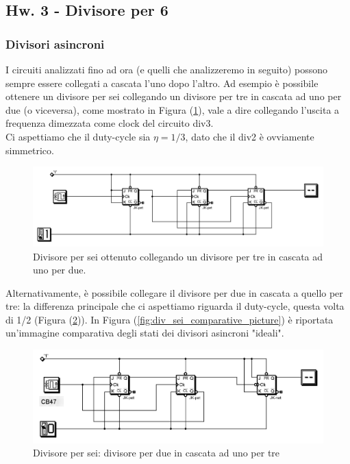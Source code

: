 \documentclass[journal, a4paper]{IEEEtran}
\begin{document}
\subsection{Hw. 3 - Divisore per 6}
\subsubsection{Divisori asincroni}
I circuiti analizzati fino ad ora (e quelli che analizzeremo in seguito) possono sempre essere collegati a cascata l'uno dopo l'altro. Ad esempio è possibile ottenere un divisore per sei collegando un divisore per tre in cascata ad uno per due (o viceversa), come mostrato in Figura (\ref{fig:Fig_div_6}), vale a dire collegando l'uscita a frequenza dimezzata come clock del circuito div3.\\ 
Ci aspettiamo che il duty-cycle sia $\eta = 1/3$, dato che il div2 è ovviamente simmetrico.\\


\begin{figure}
\centering
\includegraphics[width=0.8\linewidth]{./Fig_div_6}
\caption{Divisore per sei ottenuto collegando un divisore per tre in cascata ad uno per due.}
\label{fig:Fig_div_6}
\end{figure}


Alternativamente, è possibile collegare il divisore per due in cascata a quello per tre: la differenza principale che ci aspettiamo riguarda il duty-cycle, questa volta di 1/2 (Figura (\ref{fig:Fig_div_6_reverse})). In Figura (\ref{fig:div_sei_comparative_picture}) è riportata un'immagine comparativa degli stati dei divisori asincroni "ideali".\\


\begin{figure}
\centering
\includegraphics[width=0.8\linewidth]{./Fig_div_6_reverse}
\caption{Divisore per sei: divisore per due in cascata ad uno per tre}
\label{fig:Fig_div_6_reverse}
\end{figure}
\end{document}
